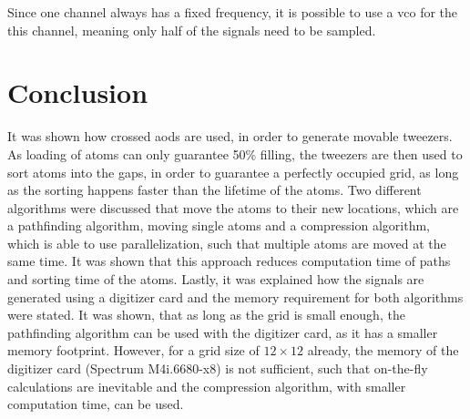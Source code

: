 Since one channel always has a fixed frequency, it is possible to use a \ac{vco} for the this channel, meaning only half of the signals need to be sampled.

\section{Conclusion}

It was shown how crossed \acp{aod} are used, in order to generate movable tweezers. As loading of atoms can only guarantee 50\% filling, the tweezers are then used to sort atoms into the gaps, in order to guarantee a perfectly occupied grid, as long as the sorting happens faster than the lifetime of the atoms. Two different algorithms were discussed that move the atoms to their new locations, which are a pathfinding algorithm, moving single atoms and a compression algorithm, which is able to use parallelization, such that multiple atoms are moved at the same time. It was shown that this approach reduces computation time of paths and sorting time of the atoms. Lastly, it was explained how the signals are generated using a digitizer card and the memory requirement for both algorithms were stated. It was shown, that as long as the grid is small enough, the pathfinding algorithm can be used with the digitizer card, as it has a smaller memory footprint. However, for a grid size of $12\times12$ already, the memory of the digitizer card (Spectrum M4i.6680-x8) is not sufficient, such that on-the-fly calculations are inevitable and the compression algorithm, with smaller computation time, can be used.
